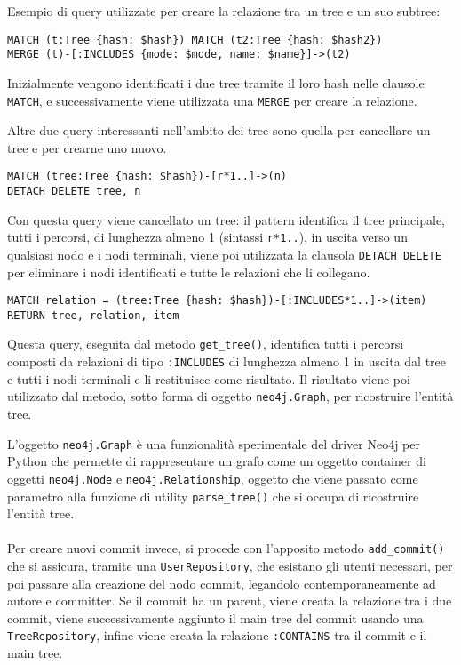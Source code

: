 Esempio di query utilizzate per creare la relazione tra un tree e un suo subtree:
\begin{verbatim}
MATCH (t:Tree {hash: $hash}) MATCH (t2:Tree {hash: $hash2})
MERGE (t)-[:INCLUDES {mode: $mode, name: $name}]->(t2)
\end{verbatim}
Inizialmente vengono identificati i due tree tramite il loro hash nelle clausole \texttt{MATCH}, e successivamente viene utilizzata una \texttt{MERGE} per creare la relazione.

Altre due query interessanti nell'ambito dei tree sono quella per cancellare un tree e per crearne uno nuovo.
\begin{verbatim}
MATCH (tree:Tree {hash: $hash})-[r*1..]->(n)
DETACH DELETE tree, n
\end{verbatim}
Con questa query viene cancellato un tree: il pattern identifica il tree principale, tutti i percorsi, di lunghezza almeno 1 (sintassi \texttt{r*1..}), in uscita verso un qualsiasi nodo e i nodi terminali, viene poi utilizzata la clausola \texttt{DETACH DELETE} per eliminare i nodi identificati e tutte le relazioni che li collegano.
\begin{verbatim}
MATCH relation = (tree:Tree {hash: $hash})-[:INCLUDES*1..]->(item)
RETURN tree, relation, item
\end{verbatim}
Questa query, eseguita dal metodo \texttt{get\_tree()}, identifica tutti i percorsi composti da relazioni di tipo \texttt{:INCLUDES} di lunghezza almeno 1 in uscita dal tree e tutti i nodi terminali e li restituisce come risultato.
Il risultato viene poi utilizzato dal metodo, sotto forma di oggetto \texttt{neo4j.Graph}, per ricostruire l'entità tree.

L'oggetto \texttt{neo4j.Graph} è una funzionalità sperimentale del driver Neo4j per Python che permette di rappresentare un grafo come un oggetto container di oggetti \texttt{neo4j.Node} e \texttt{neo4j.Relationship}, oggetto che viene passato come parametro alla funzione di utility \texttt{parse\_tree()} che si occupa di ricostruire l'entità tree.
\\~\\
Per creare nuovi commit invece, si procede con l'apposito metodo \texttt{add\_commit()} che si assicura, tramite una \texttt{UserRepository}, che esistano gli utenti necessari, per poi passare alla creazione del nodo commit, legandolo contemporaneamente ad autore e committer.
Se il commit ha un parent, viene creata la relazione tra i due commit, viene successivamente aggiunto il main tree del commit usando una \texttt{TreeRepository}, infine viene creata la relazione \texttt{:CONTAINS} tra il commit e il main tree.

